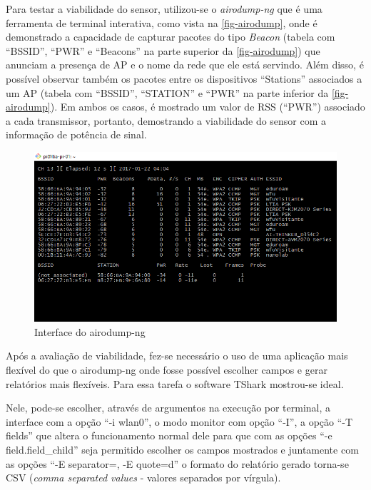 Para testar a viabilidade do sensor, utilizou-se o \emph{airodump-ng} que é uma
ferramenta de terminal interativa, como vista na \autoref{fig-airodump}, onde é
demonstrado a capacidade de capturar pacotes do tipo \emph{Beacon} (tabela com
``BSSID'', ``PWR'' e ``Beacons'' na parte superior da \autoref{fig-airodump}) que anunciam
a presença de AP e o nome da rede que
ele está servindo. Além disso, é possível observar também os pacotes entre os dispositivos ``Stations''
associados a um AP (tabela com ``BSSID'', ``STATION'' e ``PWR'' na parte inferior da
\autoref{fig-airodump}). Em ambos os casos, é mostrado um valor de RSS
(``PWR'') associado a cada transmissor, portanto, demostrando a viabilidade
do sensor com a informação de potência de sinal.

\begin{figure}[htb]
	\caption{\label{fig-airodump}Interface do airodump-ng}
	\begin{center}
	\includegraphics[width=1\textwidth]{040-plataformas/RPi-WiFi-dongles/wifi-sniff-rpi/4-rpi-airodump.png}
	\end{center}
\end{figure}


Após a avaliação de viabilidade, fez-se necessário o uso de uma aplicação mais
flexível do que o airodump-ng onde fosse possível escolher campos e gerar
relatórios mais flexíveis. Para essa tarefa o software TShark mostrou-se
ideal.

Nele, pode-se escolher, através de argumentos na execução por terminal, a
interface com a opção “-i wlan0”, o modo monitor com opção “-I”, a opção “-T
fields” que altera o funcionamento normal dele para que com as opções “-e
field.field\_child” seja permitido escolher os campos mostrados e juntamente com
as opções “-E separator=, -E quote=d” o formato do relatório gerado torna-se CSV
(\emph{comma separated values} - valores separados por vírgula).

